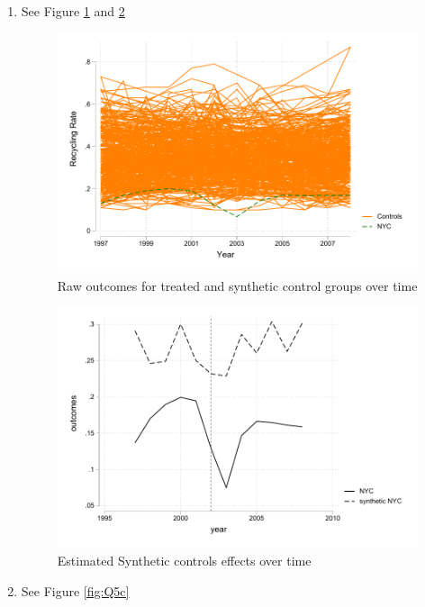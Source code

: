 \documentclass{article}
\begin{document}
\begin{enumerate}
\begin {itemize}
\begin{enumerate}[label=\alph*)]
\item See Figure \ref{fig:Q5b1} and \ref{fig:Q5b2}

\begin{figure}[htbp]
    \centering
    \includegraphics[width=\textwidth]{HWQ5b1.pdf}
    \caption{Raw outcomes for treated and synthetic control groups over time}
    \label{fig:Q5b1}
\end{figure}

\begin{figure}[htbp]
    \centering
    \includegraphics[width=\textwidth]{HWQ5b2.pdf}
    \caption{Estimated Synthetic controls effects over time}
    \label{fig:Q5b2}
\end{figure}

\item See Figure \ref{fig:Q5c}


\end{enumerate}
\end{itemize}
\end{enumerate}
\end{document}
